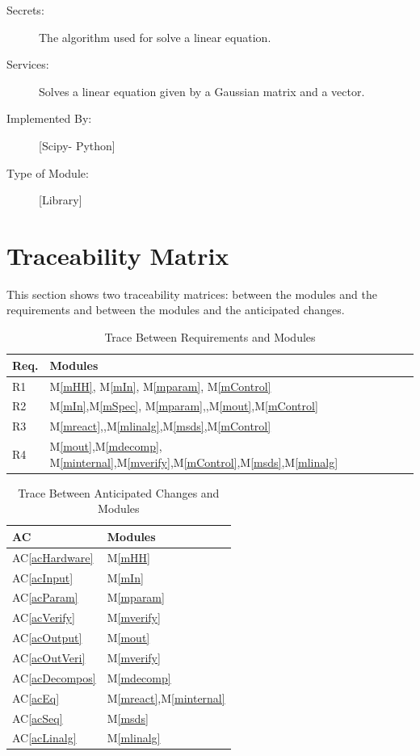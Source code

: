 \documentclass[12pt, titlepage]{article}
\newcommand{\acref}[1]{AC\ref{#1}}
\newcommand{\mref}[1]{M\ref{#1}}
\begin{document}
\begin{description}
\item[Secrets:]The algorithm used for solve a linear equation.
\item[Services:] Solves a linear equation given by a Gaussian matrix and a vector.
\item[Implemented By:] [Scipy- Python]
\item[Type of Module:] [Library]
  
\end{description}

\section{Traceability Matrix} \label{SecTM}

This section shows two traceability matrices: between the modules and the
requirements and between the modules and the anticipated changes.

\begin{table}[H]
\centering
\begin{tabular}{p{} p{}}
\toprule
\textbf{Req.} & \textbf{Modules}\\
\midrule
R1 & \mref{mHH}, \mref{mIn}, \mref{mparam}, \mref{mControl}\\
R2 & \mref{mIn},\mref{mSpec}, \mref{mparam},,\mref{mout},\mref{mControl}\\
R3 & \mref{mreact},,\mref{mlinalg},\mref{msds},\mref{mControl}\\
R4 & \mref{mout},\mref{mdecomp}, \mref{minternal},\mref{mverify},\mref{mControl},\mref{msds},\mref{mlinalg}\\

\bottomrule
\end{tabular}
\caption{Trace Between Requirements and Modules}
\label{TblRT}
\end{table}

\begin{table}[H]
\centering
\begin{tabular}{p{} p{}}
\toprule
\textbf{AC} & \textbf{Modules}\\
\midrule
\acref{acHardware} & \mref{mHH}\\
\acref{acInput} & \mref{mIn}\\
\acref{acParam} & \mref{mparam}\\
\acref{acVerify} & \mref{mverify}\\
\acref{acOutput} & \mref{mout}\\
\acref{acOutVeri} & \mref{mverify}\\
\acref{acDecompos} & \mref{mdecomp}\\
\acref{acEq} & \mref{mreact},\mref{minternal}\\
\acref{acSeq} & \mref{msds}\\
\acref{acLinalg} & \mref{mlinalg}\\
\bottomrule
\end{tabular}
\caption{Trace Between Anticipated Changes and Modules}
\label{TblACT}
\end{table}
\end{document}
